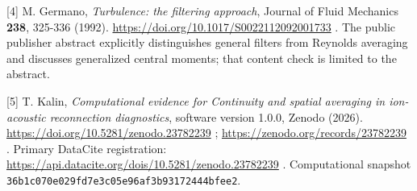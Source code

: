 {[}4{]} M. Germano, \emph{Turbulence: the filtering approach}, Journal
of Fluid Mechanics \textbf{238}, 325-336 (1992).
\url{https://doi.org/10.1017/S0022112092001733} . The public publisher
abstract explicitly distinguishes general filters from Reynolds
averaging and discusses generalized central moments; that content check
is limited to the abstract.

{[}5{]} T. Kalin, \emph{Computational evidence for Continuity and
spatial averaging in ion-acoustic reconnection diagnostics}, software
version 1.0.0, Zenodo (2026).
\url{https://doi.org/10.5281/zenodo.23782239} ;
\url{https://zenodo.org/records/23782239} . Primary DataCite
registration:
\url{https://api.datacite.org/dois/10.5281/zenodo.23782239} .
Computational snapshot
\nolinkurl{36b1c070e029fd7e3c05e96af3b93172444bfee2}.

\endgroup
